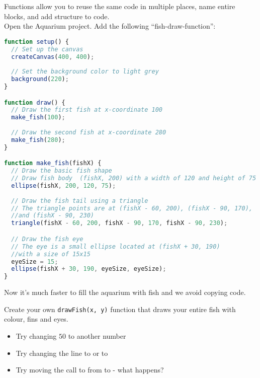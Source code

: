 
\newpage
{}

\begin{exercisebox}[adjusted title=Functions]
Functions allow you to reuse the same code in multiple places,
name entire blocks, and add structure to code.\\

Open the Aquarium project. Add the following ``fish-draw-function'':

\begin{lstlisting}[language=JavaScript]
function setup() {
  // Set up the canvas
  createCanvas(400, 400);
  
  // Set the background color to light grey
  background(220);
}

function draw() {
  // Draw the first fish at x-coordinate 100
  make_fish(100);
  
  // Draw the second fish at x-coordinate 280
  make_fish(280);
}

function make_fish(fishX) {
  // Draw the basic fish shape
  // Draw fish body  (fishX, 200) with a width of 120 and height of 75
  ellipse(fishX, 200, 120, 75);
  
  // Draw the fish tail using a triangle
  // The triangle points are at (fishX - 60, 200), (fishX - 90, 170), 
  //and (fishX - 90, 230)
  triangle(fishX - 60, 200, fishX - 90, 170, fishX - 90, 230);

  // Draw the fish eye
  // The eye is a small ellipse located at (fishX + 30, 190) 
  //with a size of 15x15
  eyeSize = 15;
  ellipse(fishX + 30, 190, eyeSize, eyeSize);
}

\end{lstlisting}

Now it's much faster to fill the aquarium with fish and we avoid copying code.

 Create your own \texttt{drawFish(x, y)} function that draws your entire fish with colour, fins and eyes.

\end{exercisebox}

\begin{exercisebox}[adjusted title=Notes and Extra]
\begin{itemize}
\item Try changing $50$ to another number
\item Try changing the line  to  or to 
\item Try moving the call to  from 
 to  - what happens?
\end{itemize}

\end{exercisebox}

